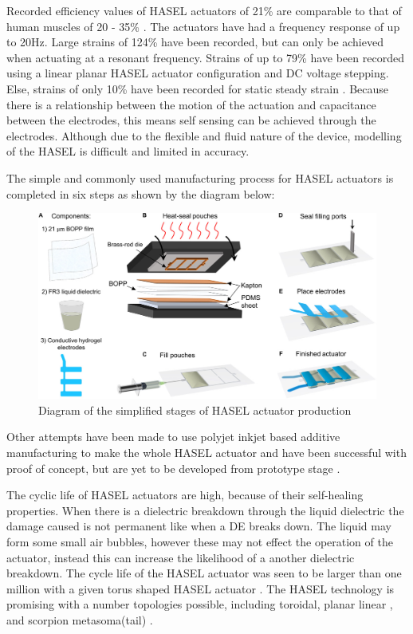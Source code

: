Recorded efficiency values of HASEL actuators of 21\% are comparable to that of human muscles of 20 - 35\% \citep{Smith2005}. The actuators have had a frequency response of up to 20Hz. Large strains of 124\% have been recorded, but can only be achieved when actuating at a resonant frequency. Strains of up to 79\% have been recorded using a linear planar HASEL actuator configuration and DC voltage stepping.  Else, strains of only 10\% have been recorded for static steady strain \citep{Kellaris2018}.
Because there is a relationship between the motion of the actuation and capacitance between the electrodes, this means self sensing can be achieved through the electrodes. Although due to the flexible and fluid nature of the device, modelling of the HASEL is difficult and limited in accuracy.

The simple and commonly used manufacturing process for HASEL actuators is completed in six steps as shown by the diagram below:
\begin{figure}[H]
	\centering
	\includegraphics[width=0.7\linewidth]{Figures/HASEL_manuf.jpg}
	\caption{Diagram of the simplified stages of HASEL actuator production \citep{Kellaris2018}}
	\label{fig:Artificial Muscle_HASEL_manf}
\end{figure}

Other attempts have been made to use polyjet inkjet based additive manufacturing to make the whole HASEL actuator and have been successful with proof of concept, but are yet to be developed from prototype stage \citep{Manionn.d.}. 

The cyclic life of HASEL actuators are high, because of their self-healing properties. When there is a dielectric breakdown through the liquid dielectric the damage caused is not permanent like when a DE breaks down. The liquid may form some small air bubbles, however these may not effect the operation of the actuator, instead this can increase the likelihood of a another dielectric breakdown. The cycle life of the HASEL actuator was seen to be larger than one million with a given torus shaped HASEL actuator \citep{Acome2018}. The HASEL technology is promising with a number topologies possible,  including toroidal, planar linear \citep{Acome2018}, and scorpion metasoma(tail) \citep{Mitchell2019}.



